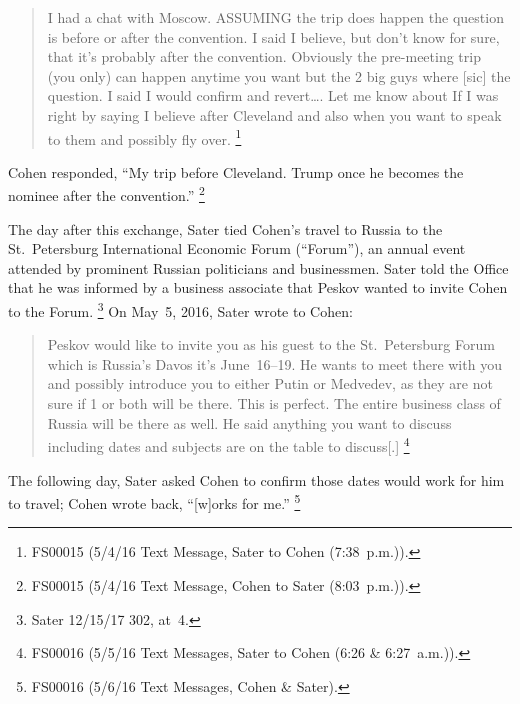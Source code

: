 \begin{quote}
I had a chat with Moscow.
ASSUMING the trip does happen the question is before or after the convention.
I said I believe, but don't know for sure, that it's probably after the convention.
Obviously the pre-meeting trip (you only) can happen anytime you want but the 2 big guys where [sic] the question.
I said I would confirm and revert\dots.
Let me know about If I was right by saying I believe after Cleveland and also when you want to speak to them and possibly fly over.%
\footnote{FS00015 (5/4/16 Text Message, Sater to Cohen (7:38~p.m.)).}
\end{quote}

Cohen responded, ``My trip before Cleveland.
Trump once he becomes the nominee after the convention.''%
\footnote{FS00015 (5/4/16 Text Message, Cohen to Sater (8:03~p.m.)).}

The day after this exchange, Sater tied Cohen's travel to Russia to the St.~Petersburg International Economic Forum (``Forum''), an annual event attended by prominent Russian politicians and businessmen.
Sater told the Office that he was informed by a business associate that Peskov wanted to invite Cohen to the Forum.%
\footnote{Sater 12/15/17 302, at~4.}
On May~5, 2016, Sater wrote to Cohen:

\begin{quote}
Peskov would like to invite you as his guest to the St.~Petersburg Forum which is Russia's Davos it's June~16--19.
He wants to meet there with you and possibly introduce you to either Putin or Medvedev, as they are not sure if 1 or both will be there.
This is perfect.
The entire business class of Russia will be there as well.
He said anything you want to discuss including dates and subjects are on the table to discuss[.]%
\footnote{FS00016 (5/5/16 Text Messages, Sater to Cohen (6:26 \& 6:27~a.m.)).}
\end{quote}

The following day, Sater asked Cohen to confirm those dates would work for him to travel; Cohen wrote back, ``[w]orks for me.''%
\footnote{FS00016 (5/6/16 Text Messages, Cohen \& Sater).}

